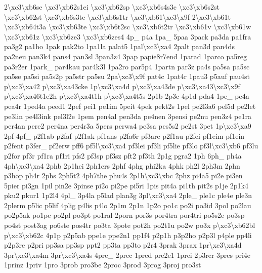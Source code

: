 \begin{DoxyCompactItemize}
2\textbackslash{}xc3\textbackslash{}xb6se \textbackslash{}xc3\textbackslash{}xb62s1ei \textbackslash{}xc3\textbackslash{}xb62sp \textbackslash{}xc3\textbackslash{}xb6s4s3c \textbackslash{}xc3\textbackslash{}xb6s2st \textbackslash{}xc3\textbackslash{}xb62st \textbackslash{}xc3\textbackslash{}xb6s3te \textbackslash{}xc3\textbackslash{}xb6s1tr \textbackslash{}xc3\textbackslash{}xb61\textbackslash{}xc3\textbackslash{}x9f 2\textbackslash{}xc3\textbackslash{}xb61t \textbackslash{}xc3\textbackslash{}xb64t3a \textbackslash{}xc3\textbackslash{}xb63te \textbackslash{}xc3\textbackslash{}xb6t2sc \textbackslash{}xc3\textbackslash{}xb6t2tr \textbackslash{}xc3\textbackslash{}xb61v \textbackslash{}xc3\textbackslash{}xb61w \textbackslash{}xc3\textbackslash{}xb61z \textbackslash{}xc3\textbackslash{}xb6ze3 \textbackslash{}xc3\textbackslash{}xb6zes4 4p\-\_\- p4a 1pa\-\_\- 5paa 3pack pa3da pa1fra pa3g2 pa1ho 1pak pak2to 1pa1la palat5 1pal\textbackslash{}xc3\textbackslash{}xa4 2palt pan3d pan4ds pa2neu pan3k4 pans4 pan3sl 3pan3z4 3pap papie8r7end 1parad 1parco pa5reg pa3r2er 1park\-\_\- par4kau par4k3l 1pa2ro par5p4 1partn par3z pa4s pa5sa pa5sc pa5se pa5si pa5s2p pa5str pa5su 2pa\textbackslash{}xc3\textbackslash{}x9f pat4c 1pat4r 1pau3 p5auf pau4st p\textbackslash{}xc3\textbackslash{}xa42 p\textbackslash{}xc3\textbackslash{}xa43cke 1p\textbackslash{}xc3\textbackslash{}xa4d p\textbackslash{}xc3\textbackslash{}xa43de p\textbackslash{}xc3\textbackslash{}xa43\textbackslash{}xc3\textbackslash{}x9f p\textbackslash{}xc3\textbackslash{}xa46t1e2h p\textbackslash{}xc3\textbackslash{}xa4t1h p\textbackslash{}xc3\textbackslash{}xa4t5s 2p1b 2p3c 4p1d pda4 1pe\-\_\- pe4a pea4r 1ped4a peed1 2pef pei1 pe1im 5peit 4pek pekt2s 1pel pe2l3a6 pel5d pe2let pe3lin pe4l3ink pel3l2e 1pem pen4al pen3da pe4nen 3pensi pe2nu pen3z4 pe1ra per4an pere2 per4na per4r3a 5pers perwa4 pe3sa pes5s2 pe2st 3pet 1p\textbackslash{}xc3\textbackslash{}xa9 2pf 4pf\-\_\- p2f1ab p2faf p2f1ak pf1ans p2fa6r pf3are p2f1au p2fei pf1eim pf1ein p2fent p3fer\-\_\- pf2erw pff6 pf5l\textbackslash{}xc3\textbackslash{}xa4 pf3lei pf3li pf5lie pf3lo pf3l\textbackslash{}xc3\textbackslash{}xb6 pf3lu p2for pf3r pf1ra pf1ri pfs2 pf3sp pf3sz pft2 pf3th 2p1g pgra2 1ph 6ph\-\_\- ph4a 4ph\textbackslash{}xc3\textbackslash{}xa4 2phb 2p1hei 2ph1ers 2phf 4phg phi2ka 4phk ph2l 2ph3m 2phn p3hop ph4r 2phs 2ph5t2 4ph7the phu4s 2p1h\textbackslash{}xc3\textbackslash{}xbc 2phz pi4a5 pi2e pi3en 5pier pi3gn 1pil pin2e 3pinse pi2o pi2pe pi5ri 1pis pit4a pi1th pit2s p1je 2p1k4 pku2 pkur1 1p2l4 4pl\-\_\- 3p4la p5lad plan3g 3pl\textbackslash{}xc3\textbackslash{}xa4 2ple\-\_\- ple1c ple4e ple3n 2plerm p5lic p5lif 4plig p4lis p4lo 2p1m 2p1n 1p2o po1c po2i po3id 3pol po2lau po2p5ak po1pe po2pl po3pt po1ral 2porn por3s por4tra por4tri po5s2e po3sp po4st post3ag po6ste pos4tr po3ta 3pote pot2h po2t1u po2w po3x p\textbackslash{}xc3\textbackslash{}xb62bl p\textbackslash{}xc3\textbackslash{}xb62c 4p1p p2p5ab ppe1e ppe2n1 pp1f4 p2p1h p3p2ho p2p3l p4ple pp4li p2p3re p2pri pp3sa pp3sp ppt2 pp3ta pp3to p2r4 3prak 3prax 1pr\textbackslash{}xc3\textbackslash{}xa4d 3pr\textbackslash{}xc3\textbackslash{}xa4m 3pr\textbackslash{}xc3\textbackslash{}xa4s 4pre\-\_\- 2prec 1pred pre2e1 1prei 2p3rer 3pres pri4e 1prinz 1priv 1pro 3prob pro3be 2proc 3prod 3prog 3proj pro3st 
\end{DoxyCompactItemize}
